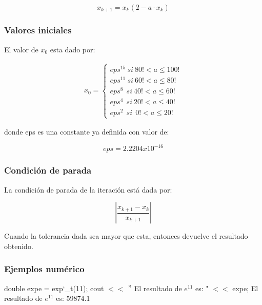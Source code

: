 \documentclass[10pt,a4paper]{article}
\begin{document}
	\begin{equation}\label{key1}
		x_{k+1} = x_{k}(2 - a\cdot x_{k})
	\end{equation}
		
	\subsubsection{Valores iniciales}
	
	El valor de $x_{0}$ esta dado por:
	
	\begin{align*}
		x_{0} = 
		\begin{cases}
			eps^{15}~ si~  80! < a \leq 100! \\
			eps^{11}~ si~  60! < a \leq 80! \\
			eps^{8}~~ si~  40! < a \leq 60! \\
			eps^{4}~~ si~  20! < a \leq 40! \\
			eps^{2}~~ si~~  0! < a \leq 20!
		\end{cases}
	\end{align*}
	
	donde eps es una constante ya definida con valor de:
	
	\begin{equation}\label{key2}
		eps = 2.2204x10^{-16}
	\end{equation}
	
	\subsubsection{Condición de parada}
	
	La condición de parada de la iteración está dada por: 
	
	\begin{equation}\label{key3}
		\left\lvert{\frac{x_{k+1} - x_{k}}{x_{k+1}}}\right\lvert
	\end{equation}

	Cuando la tolerancia dada sea mayor que esta, entonces devuelve el resultado obtenido.
	
	\subsubsection{Ejemplos numérico}

	double expe = exp\char`_t(11); \newline
	cout $<<$ $"$ El resultado de $e^{11}$ es: " $<<$ expe; \newline
	El resultado de $e^{11}$ es: 59874.1 \newline
	
\end{document}
